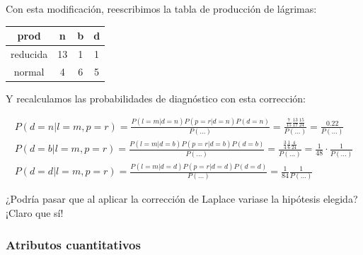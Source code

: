 \documentclass{apuntes}
\begin{document}
Con esta modificación, reescribimos la tabla de producción de lágrimas:
\begin{center}
\begin{tabular}{|c|c|c|c|}
\hline
prod & n&b&d\\\hline
reducida & 13 & 1 & 1\\\hline
normal &4&6&5\\\hline
\end{tabular}
\end{center}

Y recalculamos las probabilidades de diagnóstico con esta corrección:

\begin{gather*}
P(d=n | l=m,p=r) = \frac{P(l=m|d= n) P(p=r | d = n) P(d = n)}{P(...)} = \frac{\frac{7}{15}\frac{13}{17}\frac{15}{24}}{P(...)} = \frac{0.22}{P(...)}\\
P(d=b | l=m,p=r) = \frac{P(l=m|d= b) P(p=r | d = b) P(d = b)}{P(...)} = \frac{\frac{3}{4}\frac{1}{6}\frac{4}{24}}{P(...)} = \frac{1}{48}·\frac{1}{P(...)}\\
P(d=d | l=m,p=r) = \frac{P(l=m|d= d) P(p=r | d = d) P(d = d)}{P(...)} = \frac{1}{84}\frac{1}{P(...)}
\end{gather*}

¿Podría pasar que al aplicar la corrección de Laplace variase la hipótesis elegida? ¡Claro que sí!


\subsubsection{Atributos cuantitativos}
\end{document}
